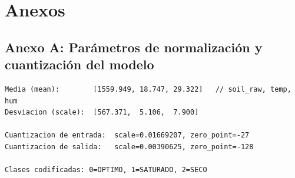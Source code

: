 \documentclass[12pt,a4paper]{article}
\begin{document}
\newpage
\section*{Anexos}

\subsection*{Anexo A: Parámetros de normalización y cuantización del modelo}

\begin{lstlisting}
Media (mean):        [1559.949, 18.747, 29.322]   // soil_raw, temp, hum
Desviacion (scale):  [567.371,  5.106,  7.900]

Cuantizacion de entrada:  scale=0.01669207, zero_point=-27
Cuantizacion de salida:   scale=0.00390625, zero_point=-128

Clases codificadas: 0=OPTIMO, 1=SATURADO, 2=SECO
\end{lstlisting}
\end{document}
